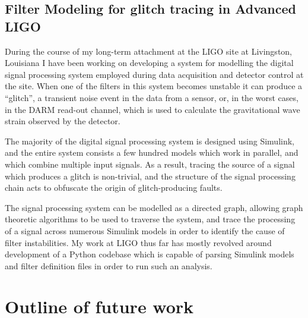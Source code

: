 \documentclass[openleft]{kentigern}
\theoremstyle{definition}
\begin{document}
\section{Filter Modeling for glitch tracing in Advanced LIGO}
\label{sec:glitchtracing}

During the course of my long-term attachment at the LIGO site at
Livingston, Louisiana I have been working on developing a system for
modelling the digital signal processing system employed during data
acquisition and detector control at the site. When one of the filters
in this system becomes unstable it can produce a ``glitch'', a
transient noise event in the data from a sensor, or, in the worst
cases, in the DARM read-out channel, which is used to calculate the
gravitational wave strain observed by the detector.

The majority of the digital signal processing system is designed using
Simulink, and the entire system consists a few hundred models which
work in parallel, and which combine multiple input signals. As a
result, tracing the source of a signal which produces a glitch is
non-trivial, and the structure of the signal processing chain acts to
obfuscate the origin of glitch-producing faults.

The signal processing system can be modelled as a directed graph,
allowing graph theoretic algorithms to be used to traverse the system,
and trace the processing of a signal across numerous Simulink models
in order to identify the cause of filter instabilities. My work at
LIGO thus far has mostly revolved around development of a Python
codebase which is capable of parsing Simulink models and filter
definition files in order to run such an analysis.


\appendices

\chapter{Outline of future work}
\label{part:future}

\backmatter





%
%

\glsaddall
{}
\printglossaries
\end{document}
